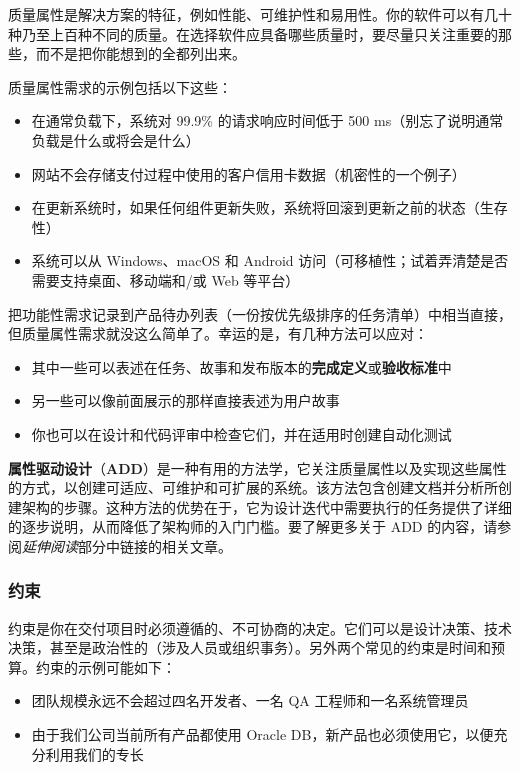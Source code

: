 \label{idx:144}
\label{idx:145}
质量属性是解决方案的特征，例如性能、可维护性和易用性。你的软件可以有几十种乃至上百种不同的质量。在选择软件应具备哪些质量时，要尽量只关注重要的那些，而不是把你能想到的全都列出来。

\label{idx:146}
质量属性需求的示例包括以下这些：

\begin{itemize}
\item 在通常负载下，系统对 99.9\% 的请求响应时间低于 500 ms（别忘了说明通常负载是什么或将会是什么）
\item 网站不会存储支付过程中使用的客户信用卡数据（机密性的一个例子）
\item 在更新系统时，如果任何组件更新失败，系统将回滚到更新之前的状态（生存性）
\label{idx:147}
\item 系统可以从 Windows、macOS 和 Android 访问（可移植性；试着弄清楚是否需要支持桌面、移动端和/或 Web 等平台）
\end{itemize}

\label{idx:148}
把功能性需求记录到产品待办列表（一份按优先级排序的任务清单）中相当直接，但质量属性需求就没这么简单了。幸运的是，有几种方法可以应对：

\begin{itemize}
\item 其中一些可以表述在任务、故事和发布版本的\textbf{完成定义}或\textbf{验收标准}中
\item 另一些可以像前面展示的那样直接表述为用户故事
\item 你也可以在设计和代码评审中检查它们，并在适用时创建自动化测试
\end{itemize}

\label{idx:149}
\textbf{属性驱动设计}（\textbf{ADD}）是一种有用的方法学，它关注质量属性以及实现这些属性的方式，以创建可适应、可维护和可扩展的系统。该方法包含创建文档并分析所创建架构的步骤。这种方法的优势在于，它为设计迭代中需要执行的任务提供了详细的逐步说明，从而降低了架构师的入门门槛。要了解更多关于 ADD 的内容，请参阅\emph{延伸阅读}部分中链接的相关文章。

\subsubsection{约束}

\label{idx:150}
\label{idx:151}
\label{idx:152}
约束是你在交付项目时必须遵循的、不可协商的决定。它们可以是设计决策、技术决策，甚至是政治性的（涉及人员或组织事务）。另外两个常见的约束是时间和预算。约束的示例可能如下：

\begin{itemize}
\item 团队规模永远不会超过四名开发者、一名 QA 工程师和一名系统管理员
\item 由于我们公司当前所有产品都使用 Oracle DB，新产品也必须使用它，以便充分利用我们的专长
\end{itemize}

